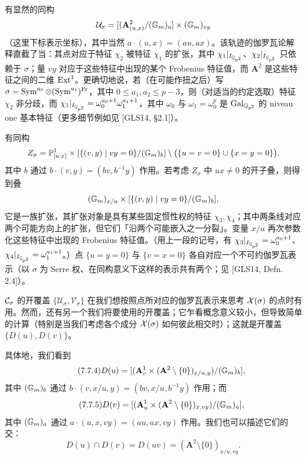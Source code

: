 有显然的同构
\[
\mathcal U_\sigma=[(\mathbf A^2_{(u,x)}/(\mathbb{G}_m)_a]\times(\mathbb{G}_m)_{vy}
\]
（这里下标表示坐标），其中当然 $a\cdot(u,x)=(au,ax)$。该轨迹的伽罗瓦论解释直截了当：其点对应于特征 $\chi_2$ 被特征 $\chi_1$ 的扩张，其中 $\chi_1|_{I_{\mathbb{Q}_{p^2}}}$、$\chi_2|_{I_{\mathbb{Q}_{p^2}}}$ 只依赖于 $\sigma$；量 $vy$ 对应于这些特征中出现的某个 Frobenius 特征值，而 $\mathbf A^2$ 是这些特征之间的二维 $\operatorname{Ext}^1$。更确切地说，若（在可能作扭之后）写 $\sigma=\operatorname{Sym}^{a_0}\otimes(\operatorname{Sym}^{a_1})^{\mathrm{Fr}}$，其中 $0\le a_1,a_2\le p-3$，则（对适当的约定选取）特征 $\chi_2$ 非分歧，而 $\chi_1|_{I_{\mathbb{Q}_{p^2}}}=\omega_0^{a_0+1}\omega_1^{a_1+1}$，其中 $\omega_0$ 与 $\omega_1=\omega_0^p$ 是 $\operatorname{Gal}_{\mathbb{Q}_{p^2}}$ 的 niveau one 基本特征（更多细节例如见 [GLS14, §2.1]）。

有同构
\[
Z_\sigma=\mathbb{P}^1_{[u:x]}\times[\{(v,y)\mid vy=0\}/(\mathbb{G}_m)_b]\setminus\bigl(\{u=v=0\}\cup\{x=y=0\}\bigr),
\]
其中 $b$ 通过 $b\cdot(v,y)=(bv,b^{-1}y)$ 作用。若考虑 $Z_\sigma$ 中 $ux\neq0$ 的开子叠，则得到叠
\[
(\mathbb{G}_m)_{x/u}\times[\{(v,y)\mid vy=0\}/(\mathbb{G}_m)_b],
\]
它是一族扩张，其扩张对象是具有某些固定惯性权的特征 $\chi_3,\chi_4$；其中两条线对应两个可能方向上的扩张，但它们「沿两个可能嵌入之一分裂」。变量 $x/u$ 再次参数化这些特征中出现的 Frobenius 特征值。（用上一段的记号，有 $\chi_3|_{I_{\mathbb{Q}_{p^2}}}=\omega_0^{a_0+1}$、$\chi_4|_{I_{\mathbb{Q}_{p^2}}}=\omega_1^{a_1+1}$。）点 $\{u=y=0\}$ 与 $\{v=x=0\}$ 各自对应一个不可约伽罗瓦表示（以 $\sigma$ 为 Serre 权、在同构意义下这样的表示共有两个；见 [GLS14, Defn. 2.4]）。

$\mathcal{C}_\sigma$ 的开覆盖 $\{\mathcal U_\sigma,\mathcal V_\sigma\}$ 在我们想按照点所对应的伽罗瓦表示来思考 $\mathcal{X}(\sigma)$ 的点时有用。然而，还有另一个我们将要使用的开覆盖；它乍看概念意义较小，但导致简单的计算（特别是当我们考虑各个成分 $\mathcal{X}(\sigma)$ 如何彼此相交时）；这就是开覆盖 $\{D(u),D(v)\}$。

具体地，我们看到
\begin{equation}\tag{7.7.4}\label{eq:a4-7-7-4}
D(u)=[(\mathbf A^1_v\times(\mathbf A^2\setminus\{0\})_{x/u,y})/(\mathbb{G}_m)_b],
\end{equation}
其中 $(\mathbb{G}_m)_b$ 通过 $b\cdot(v,x/u,y)=(bv,x/u,b^{-1}y)$ 作用；而
\begin{equation}\tag{7.7.5}\label{eq:a4-7-7-5}
D(v)=[(\mathbf A^1_u\times(\mathbf A^2\setminus\{0\})_{x,vy})/(\mathbb{G}_m)_a],
\end{equation}
其中 $(\mathbb{G}_m)_a$ 通过 $a\cdot(u,x,vy)=(au,ax,vy)$ 作用。我们也可以描述它们的交：
\[
D(u)\cap D(v)=D(uv)=(\mathbf A^2\setminus\{0\})_{x/u,vy}.
\]

